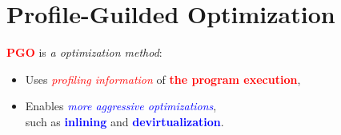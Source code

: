 \section{Profile-Guilded Optimization}
\begin{frame}[t]
  \frametitlesec
  \pause

  \textbf{\textcolor{red}{PGO}} is \textit{a optimization method}:

  \pause
  \begin{itemize}[<+->]
    \item Uses \textcolor{red}{\it profiling information} of \textcolor{red}{\bf the program execution},
    \item Enables \textcolor{blue}{\it more aggressive optimizations},\\

      such as \textcolor{blue}{\textbf{inlining}} and \textcolor{blue}{\textbf{devirtualization}}.
  \end{itemize}
\end{frame}
